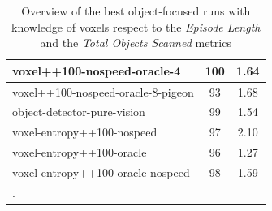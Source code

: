 \begin{longtable}{|l|c|c|}
voxel++100-nospeed-oracle-4 & 100 & {\cellcolor[HTML]{A9D2CA}} \color[HTML]{000000} 1.64 \\ \hline
voxel++100-nospeed-oracle-8-pigeon & 93 & {\cellcolor[HTML]{A1CFC5}} \color[HTML]{000000} 1.68 \\ \hline
object-detector-pure-vision & 99 & {\cellcolor[HTML]{BADBD4}} \color[HTML]{000000} 1.54 \\ \hline
voxel-entropy++100-nospeed & 97 & {\cellcolor[HTML]{55AA99}} \color[HTML]{F1F1F1} 2.10 \\ \hline
voxel-entropy++100-oracle & 96 & {\cellcolor[HTML]{EBF2F0}} \color[HTML]{000000} 1.27 \\ \hline
voxel-entropy++100-oracle-nospeed & 98 & {\cellcolor[HTML]{B1D6CE}} \color[HTML]{000000} 1.59 \\ \hline


    \caption{Overview of the best object-focused runs with knowledge of voxels respect to the \textit{Episode Length} and the \textit{Total Objects Scanned} metrics}. \label{tab:RQ1-results}
\end{longtable}

